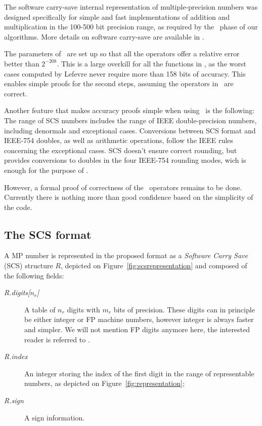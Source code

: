 The software carry-save internal representation of multiple-precision
numbers was designed specifically for simple and fast implementations
of addition and multiplication in the 100-500 bit precision range, as
required by the \accurate\ phase of our algorithms. More details on
software carry-save are available in \cite{DefDin2002,DinDef2003}.

The parameters of \scslib\ are set up so that all the operators offer
a relative error better than $2^{-208}$.  This is a large overkill for
all the functions in \crlibm, as the worst cases computed by Lefevre
never require more than 158 bits of accuracy. This enables simple
proofs for the second steps, assuming the operators in \scslib\ are
correct.

Another feature that makes accuracy proofs simple when using \scslib\ 
is the following: The range of SCS numbers includes the range of IEEE
double-precision numbers, including denormals and exceptional cases.
Conversions between SCS format and IEEE-754 doubles, as well as
arithmetic operations, follow the IEEE rules concerning the
exceptional cases. SCS doesn't ensure correct rounding, but provides
conversions to doubles in the four IEEE-754 rounding modes, wich is
enough for the purpose of \crlibm.

However, a formal proof of correctness of the \scslib\ operators
remains to be done. Currently there is nothing more than good
confidence based on the simplicity of the code.


\subsection{The SCS format}

 A MP number is represented in the proposed format as a
\emph{Software Carry Save} (SCS) structure $R$, depicted on
Figure~\ref{fig:scsrepresentation} and composed of the following
fields:
\begin{description}
\item[\emph{R.digits[$n_r$]}] A table of $n_r$ digits with $m_r$ bits
  of precision. These digits can in principle be either integer or FP
  machine numbers, however integer is always faster and simpler. We
  will not mention FP digits anymore here, the interested reader is
  referred to \cite{DefDin2002,DinDef2003}.
\item[\emph{R.index}] An integer storing the index of the first digit
  in the range of representable numbers, as depicted on
  Figure~\ref{fig:representation};
 \item[\emph{R.sign}] A sign information.  
\end{description}

